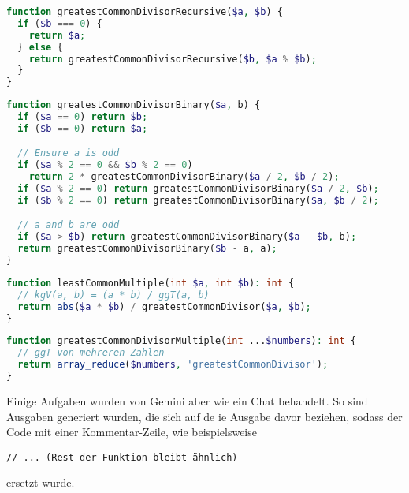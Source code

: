 \begin{lstlisting}[language=PHP,label=lst:gemini_result_php-3_1,caption={Gemini Ergebnis für das PHP-3 Problem Version 1}]
function greatestCommonDivisorRecursive($a, $b) {
  if ($b === 0) {
    return $a;
  } else {
    return greatestCommonDivisorRecursive($b, $a % $b);
  }
}
\end{lstlisting}

\begin{lstlisting}[language=PHP,label=lst:gemini_result_php-3_2,caption={Gemini Ergebnisse für das PHP-3 Problem Version 2}]
function greatestCommonDivisorBinary($a, b) {
  if ($a == 0) return $b;
  if ($b == 0) return $a;

  // Ensure a is odd
  if ($a % 2 == 0 && $b % 2 == 0)
    return 2 * greatestCommonDivisorBinary($a / 2, $b / 2);
  if ($a % 2 == 0) return greatestCommonDivisorBinary($a / 2, $b);
  if ($b % 2 == 0) return greatestCommonDivisorBinary($a, $b / 2);

  // a and b are odd
  if ($a > $b) return greatestCommonDivisorBinary($a - $b, b);
  return greatestCommonDivisorBinary($b - a, a);
}
\end{lstlisting}

\begin{lstlisting}[language=PHP,label=lst:gemini_result_php-3_3,caption={Gemini Ergebnisse für das PHP-3 Problem Version 3}]
function leastCommonMultiple(int $a, int $b): int {
  // kgV(a, b) = (a * b) / ggT(a, b)
  return abs($a * $b) / greatestCommonDivisor($a, $b);
}
\end{lstlisting}

\begin{lstlisting}[language=PHP,label=lst:gemini_result_php-3_4,caption={Gemini Ergebnisse für das PHP-3 Problem Version 4}]
function greatestCommonDivisorMultiple(int ...$numbers): int {
  // ggT von mehreren Zahlen
  return array_reduce($numbers, 'greatestCommonDivisor');
}
\end{lstlisting}

Einige Aufgaben wurden von Gemini aber wie ein Chat behandelt. So sind Ausgaben generiert wurden, die sich auf de
ie Ausgabe davor beziehen, sodass der Code mit einer Kommentar-Zeile, wie beispielsweise

\texttt{// ... (Rest der Funktion bleibt ähnlich)}

ersetzt wurde.



